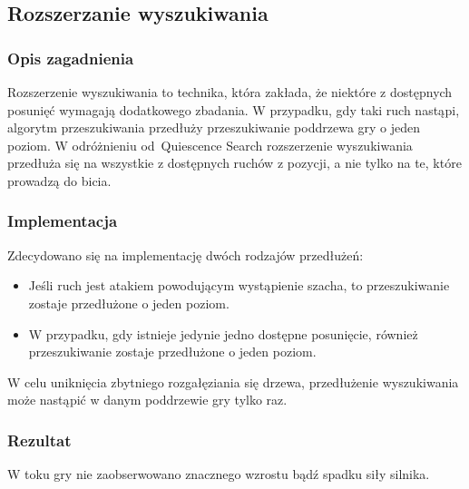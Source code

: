 \subsection{Rozszerzanie wyszukiwania}
\label{subsec:rozszerzanie-wyszukiwania}

\subsubsection{Opis zagadnienia}
Rozszerzenie wyszukiwania to technika, która zakłada, że niektóre z dostępnych posunięć wymagają dodatkowego zbadania.
W przypadku, gdy taki ruch nastąpi, algorytm przeszukiwania przedłuży przeszukiwanie poddrzewa gry o jeden poziom.
W odróżnieniu od~Quiescence Search rozszerzenie wyszukiwania przedłuża się na wszystkie z dostępnych ruchów z pozycji, a nie tylko na te, które prowadzą do bicia.

\subsubsection{Implementacja}
Zdecydowano się na implementację dwóch rodzajów przedłużeń:
\begin{itemize}
    \item Jeśli ruch jest atakiem powodującym wystąpienie szacha, to przeszukiwanie zostaje przedłużone o jeden poziom.
    \item W przypadku, gdy istnieje jedynie jedno dostępne posunięcie, również przeszukiwanie zostaje przedłużone o jeden poziom.
\end{itemize}
W celu uniknięcia zbytniego rozgałęziania się drzewa, przedłużenie wyszukiwania może nastąpić w danym poddrzewie gry tylko raz.
\subsubsection{Rezultat}
W toku gry nie zaobserwowano znacznego wzrostu bądź spadku siły silnika.
